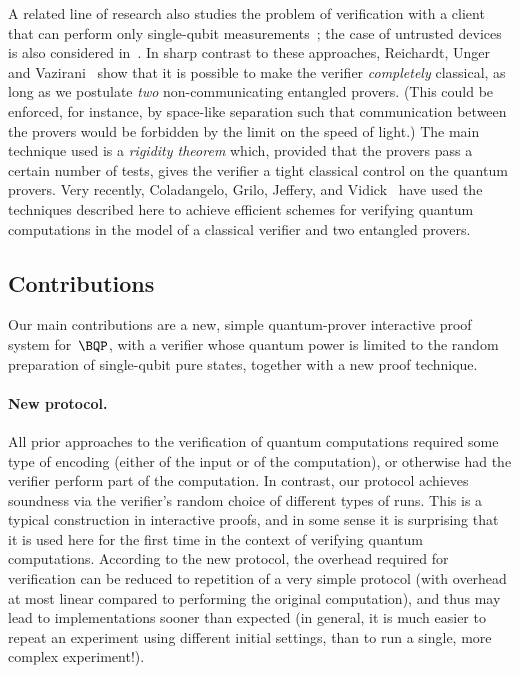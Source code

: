 \documentclass{toc}
\begin{document}
A related line of research also studies the problem of verification with a client that can perform only single-qubit measurements~\cite{HM15}; the case of untrusted devices is also considered in~\cite{HH16}. In sharp contrast to these approaches, Reichardt, Unger  and Vazirani~\cite{RUV13} show that it is possible to make the verifier \emph{completely} classical, as long as we postulate \emph{two} non-communicating entangled
%
provers.  (This
could be enforced, for instance, by space-like separation such that
communication between the provers would be forbidden by the limit on the
%
speed of light.)   %
The main technique used  is a \emph{rigidity theorem} which, provided that the provers pass a certain number of tests, gives the verifier a tight classical control on the quantum provers. Very recently, Coladangelo, Grilo,  Jeffery, and  Vidick~\cite{CGJV17} have used the techniques described here to achieve efficient schemes for verifying quantum computations in the model of a classical verifier and two entangled provers.



\subsection{Contributions}

Our main contributions are a new, simple  quantum-prover interactive proof system for~$\BQP$, with a verifier whose quantum power is limited to the random preparation of single-qubit pure states, together with a new proof
technique.  %

\paragraph{New protocol.}
All prior approaches to the verification of quantum computations required some type of encoding (either of the input or of the computation), or otherwise had the verifier perform part of the computation. In contrast,  our protocol achieves soundness via the verifier's random choice of different types of runs. This is a typical construction in interactive proofs, and in some sense it is surprising that it is used here for the
first time in the context of verifying quantum computations. According to the new protocol, the overhead required for verification can be reduced to repetition of a very simple protocol (with overhead at most linear compared to performing the original computation), and thus may lead to implementations sooner than expected  (in general, it is much easier to repeat an experiment using different initial settings, than to run a single, more complex experiment!).
\end{document}
